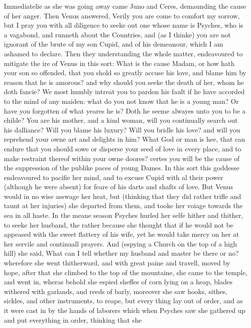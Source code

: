 Immediatelie as she was going away came Juno and Ceres, demaunding the cause of
her anger. Then Venus answered, Verily you are come to comfort my sorrow, but I
pray you with all diligence to seeke out one whose name is Psyches, who is a
vagabond, and runneth about the Countries, and (as I thinke) you are not
ignorant of the brute of my son Cupid, and of his demeanour, which I am ashamed
to declare. Then they understanding the whole matter, endeavoured to mitigate
the ire of Venus in this sort: What is the cause Madam, or how hath your son so
offended, that you shold so greatly accuse his love, and blame him by reason
that he is amorous? and why should you seeke the death of her, whom he doth
fancie? We most humbly intreat you to pardon his fault if he have accorded to
the mind of any maiden: what do you not know that he is a young man? Or have
you forgotten of what yeares he is? Doth he seeme alwayes unto you to be a
childe? You are his mother, and a kind woman, will you continually search out
his dalliance? Will you blame his luxury? Will you bridle his love? and will
you reprehend your owne art and delights in him? What God or man is hee, that
can endure that you should sowe or disperse your seed of love in every place,
and to make restraint thereof within your owne doores? certes you will be the
cause of the suppression of the publike paces of young Dames. In this sort this
goddesse endeavoured to pacifie her mind, and to excuse Cupid with al their
power (although he were absent) for feare of his darts and shafts of love. But
Venus would in no wise asswage her heat, but (thinking that they did rather
trifle and taunt at her injuries) she departed from them, and tooke her voiage
towards the sea in all haste. In the meane season Psyches hurled her selfe
hither and thither, to seeke her husband, the rather because she thought that
if he would not be appeased with the sweet flattery of his wife, yet he would
take mercy on her at her servile and continuall prayers. And (espying a Church
on the top of a high hill) she said, What can I tell whether my husband and
master be there or no? wherefore she went thitherward, and with great paine and
travell, moved by hope, after that she climbed to the top of the mountaine, she
came to the temple, and went in, wheras behold she espied sheffes of corn lying
on a heap, blades withered with garlands, and reeds of barly, moreover she saw
hooks, sithes, sickles, and other instruments, to reape, but every thing lay
out of order, and as it were cast in by the hands of laborers which when
Psyches saw she gathered up and put everything in order, thinking that she
